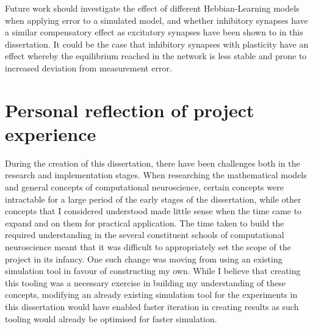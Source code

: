 Future work should investigate the effect of different Hebbian-Learning models
when applying error to a simulated model, and whether inhibitory synapses have a
similar compensatory effect as excitatory synapses have been shown to in this
dissertation. It could be the case that inhibitory synapses with plasticity have
an effect whereby the equilibrium reached in the network is less stable and
prone to increased deviation from measurement error.

\section{Personal reflection of project experience}
 



During the creation of this dissertation, there have been challenges both in the
research and implementation stages. When researching the mathematical models and
general concepts of computational neuroscience, certain concepts were
intractable for a large period of the early stages of the dissertation, while
other concepts that I considered understood made little sense when the time came
to expand and on them for practical application. The time taken to build the
required understanding in the several constituent schools of computational
neuroscience meant that it was difficult to appropriately set the scope of the
project in its infancy. One such change was moving from using an existing
simulation tool in favour of constructing my own. While I believe that creating this tooling was a
necessary exercise in building my understanding of these concepts, modifying an
already existing simulation tool for the experiments in this dissertation would
have enabled faster iteration in creating results as such tooling would already
be optimised for faster simulation.

